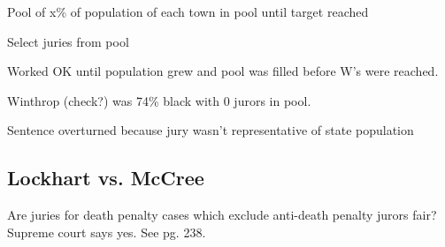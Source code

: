 \documentclass[landscape]{exam}
\begin{document}
  \begin{itemize*}
    \item Pool of x\% of population of each town in pool until target reached
    \item Select juries from pool
    \item Worked OK until population grew and pool was filled before W's were
      reached.
    \item Winthrop (check?) was 74\% black with 0 jurors in pool.
    \item Sentence overturned because jury wasn't representative of state
      population
  \end{itemize*}

  \subsection{Lockhart vs. McCree}
  Are juries for death penalty cases which exclude anti-death penalty jurors
  fair?  Supreme court says yes. See pg. 238.
\end{document}
